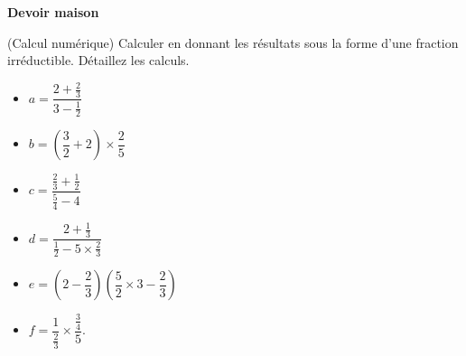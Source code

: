 \documentclass[12pt,
addpoints,
answers,
fleqn
]{exam}
\begin{document}
\begin{center}
    {\huge\bfseries Devoir maison }
    \par\bigskip
\end{center}

\begin{questions}

    \question (Calcul numérique) Calculer en donnant les résultats sous la forme d'une fraction irréductible. Détaillez les calculs.
    \begin{multicols}{3}
        \begin{itemize}
            \item[] $a= \dfrac{2+\frac{2}{3}}{3-\frac{1}{2}}$ \\
            \item[] $b=\left( \dfrac{3}{2}+2\right)\times \dfrac{2}{5}$ \\
            \item[] $c=\dfrac{\frac{2}{3}+\frac{1}{2}}{\frac{5}{4}-4}$ \\
            \item[] $d=\dfrac{2+\frac{1}{3}}{\frac{1}{2}-5\times\frac{2}{3}}$ \\
            \item[] $ e=\left(2 - \dfrac{2}{3}\right)\left(\dfrac{5}{2}\times 3 - \dfrac{2}{3}\right)$
            \item[] $f=\dfrac{1}{\frac{2}{3}}\times\dfrac{\frac{3}{4}}{5}.$
        \end{itemize}
    \end{multicols}


\end{questions}
\end{document}
